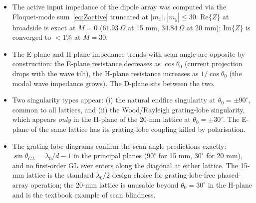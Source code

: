\documentclass{article}
\begin{document}
\begin{itemize}
\item The active input impedance of the dipole array was computed via the Floquet-mode sum~\eqref{eq:Zactive} truncated at $|m_x|, |m_y| \leq 30$. Re$\{Z\}$ at broadside is exact at $M=0$ ($\SI{61.93}{\Omega}$ at 15 mm, $\SI{34.84}{\Omega}$ at 20 mm); Im$\{Z\}$ is converged to $<1\%$ at $M=30$.
\item The E-plane and H-plane impedance trends with scan angle are opposite by construction: the E-plane resistance decreases as $\cos\theta_0$ (current projection drops with the wave tilt), the H-plane resistance increases as $1/\cos\theta_0$ (the modal wave impedance grows). The D-plane sits between the two.
\item Two singularity types appear: (i) the natural endfire singularity at $\theta_0 = \pm 90^\circ$, common to all lattices, and (ii) the Wood/Rayleigh grating-lobe singularity, which appears \emph{only} in the H-plane of the 20-mm lattice at $\theta_0 = \pm 30^\circ$. The E-plane of the same lattice has its grating-lobe coupling killed by polarisation.
\item The grating-lobe diagrams confirm the scan-angle predictions exactly: $\sin\theta_{GL} = \lambda_0/d - 1$ in the principal planes ($90^\circ$ for 15 mm, $30^\circ$ for 20 mm), and no first-order GL ever enters along the diagonal at either lattice. The 15-mm lattice is the standard $\lambda_0/2$ design choice for grating-lobe-free phased-array operation; the 20-mm lattice is unusable beyond $\theta_0 = 30^\circ$ in the H-plane and is the textbook example of scan blindness.
\end{itemize}
\end{document}
